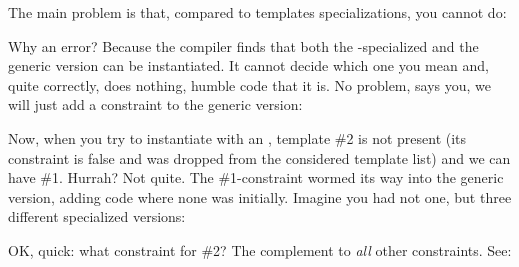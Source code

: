 The main problem is that, compared to templates specializations, you cannot do:


Why an error? Because the compiler finds that both the -specialized and the generic version can be instantiated. It cannot decide which one you mean and, quite correctly, does nothing, humble code that it is. No problem, says you, we will just add a constraint to the generic version:


Now, when you try to instantiate with an , template \#2 is not present (its constraint is false and was dropped from the considered template list) and we can have \#1. Hurrah? Not quite. The \#1-constraint wormed its way into the generic version, adding code where none was initially. Imagine you had not one, but three different specialized versions:


OK, quick: what constraint for \#2? The complement to \emph{all} other constraints. See:


